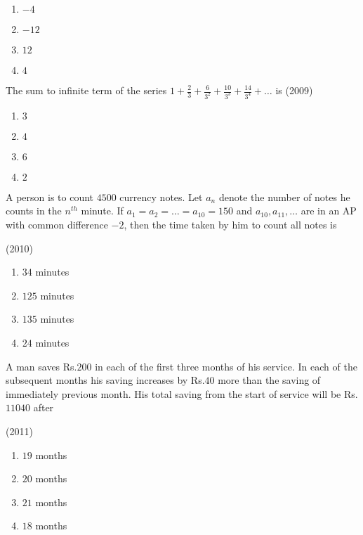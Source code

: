     \begin{enumerate}
    \item$-4$
    \item$-12$
    \item$12$ 
    \item$4$ 
    \end{enumerate}

    \item The sum to infinite term of the series $1+\frac{2}{3}+\frac{6}{3^2}+\frac{10}{3^3}+\frac{14}{3^4}+\dots$ is
    \hfill(2009)
    \begin{enumerate}
    \item $3$
    \item $4$
    \item $6$
    \item $2$
    \end{enumerate}

    \item  A person is to count $4500$ currency notes. Let $a_n$ denote the number of notes he counts in the $n^{th}$ minute. If $a_1=a_2=\dots=a_{10}=150$ and $a_{10},a_{11},\dots$ are in an AP with common difference $-2$, then the time taken by him to count all notes is   
     
    \hfill(2010)
    
    \begin{enumerate}
    \item$34$ minutes
    \item$125$ minutes
    \item$135$ minutes
    \item$24$ minutes 
    \end{enumerate}

    \item A man saves Rs.$200$ in each of the first three months of his service. In each of the subsequent months his saving increases by Rs.$40$ more than the saving of immediately previous month. His total saving from the start of service will be Rs.$11040$ after    
    
    \hfill(2011)
    
    \begin{enumerate}
    \item$19$ months
    \item$20$ months
    \item$21$ months
    \item$18$ months

    \end{enumerate}

